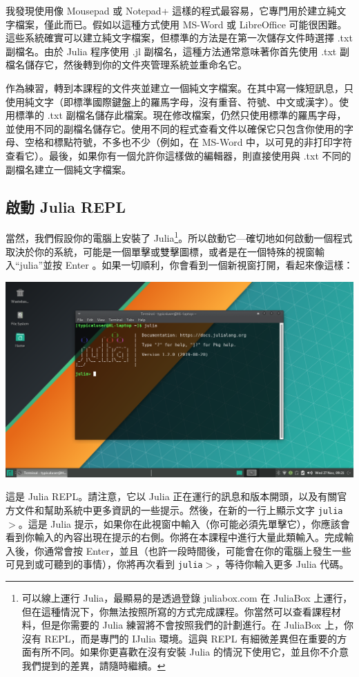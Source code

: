\documentclass[]{article}
\begin{document}
我發現使用像 Mousepad 或 Notepad+ 這樣的程式最容易，它專門用於建立純文字檔案，僅此而已。假如以這種方式使用 MS-Word 或 LibreOffice 可能很困難。這些系統確實可以建立純文字檔案，但標準的方法是在第一次儲存文件時選擇 .txt 副檔名。由於 Julia 程序使用 .jl 副檔名，這種方法通常意味著你首先使用 .txt 副檔名儲存它，然後轉到你的文件夾管理系統並重命名它。

作為練習，轉到本課程的文件夾並建立一個純文字檔案。在其中寫一條短訊息，只使用純文字（即標準國際鍵盤上的羅馬字母，沒有重音、符號、中文或漢字）。使用標準的 .txt 副檔名儲存此檔案。現在修改檔案，仍然只使用標準的羅馬字母，並使用不同的副檔名儲存它。使用不同的程式查看文件以確保它只包含你使用的字母、空格和標點符號，不多也不少（例如，在 MS-Word 中，以可見的非打印字符查看它）。最後，如果你有一個允許你這樣做的編輯器，則直接使用與 .txt 不同的副檔名建立一個純文字檔案。

\subsection*{啟動 Julia REPL}

當然，我們假設你的電腦上安裝了 Julia\footnote{可以線上運行 Julia，最顯易的是透過登錄 juliabox.com 在 JuliaBox 上運行，但在這種情況下，你無法按照所寫的方式完成課程。你當然可以查看課程材料，但是你需要的 Julia 練習將不會按照我們的計劃進行。在 JuliaBox 上，你沒有 REPL，而是專門的 IJulia 環境。這與 REPL 有細微差異但在重要的方面有所不同。如果你更喜歡在沒有安裝 Julia 的情況下使用它，並且你不介意我們提到的差異，請隨時繼續。}。所以啟動它---確切地如何啟動一個程式取決於你的系統，可能是一個單擊或雙擊圖標，或者是在一個特殊的視窗輸入``julia''並按 Enter 。如果一切順利，你會看到一個新視窗打開，看起來像這樣：

\includegraphics[scale=0.25]{REPL.png}

這是 Julia REPL。請注意，它以 Julia 正在運行的訊息和版本開頭，以及有關官方文件和幫助系統中更多資訊的一些提示。然後，在新的一行上顯示文字 {\tt julia$ > $}。這是 Julia 提示，如果你在此視窗中輸入（你可能必須先單擊它），你應該會看到你輸入的內容出現在提示的右側。你將在本課程中進行大量此類輸入。完成輸入後，你通常會按 Enter，並且（也許一段時間後，可能會在你的電腦上發生一些可見到或可聽到的事情），你將再次看到 {\tt julia$ > $}，等待你輸入更多 Julia 代碼。
\end{document}
